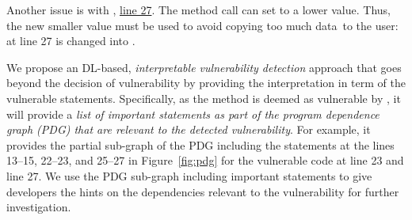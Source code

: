 Another issue is with
, \underline{line 27}. The method call 
 can set  to a lower
value. Thus, the new smaller value must be used to avoid copying too
much data~to the user:  at line 27 is changed
into .



We propose an DL-based, {\em interpretable vulnerability detection}
approach that goes beyond the decision of vulnerability by providing
the interpretation in term of the vulnerable
statements. Specifically, as the method is deemed as vulnerable by
{\tool}, it will provide a {\em list of important statements as part
  of the program dependence graph (PDG) that are relevant to the
  detected vulnerability}. For example, it provides the partial
sub-graph of the PDG including the statements at the lines 13--15,
22--23, and 25--27 in Figure~\ref{fig:pdg} for the vulnerable code at
line 23 and line 27. We use the PDG sub-graph including important
statements to give developers the hints on the dependencies relevant
to the vulnerability for further investigation.



